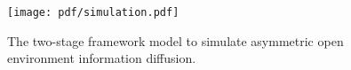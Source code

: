 



\begin{figure}[!ht]
    \centering
    \texttt{[image: pdf/simulation.pdf]}
    \caption{The two-stage framework model to simulate asymmetric open environment information diffusion.}
    \label{fig:Simulation}
\end{figure}







